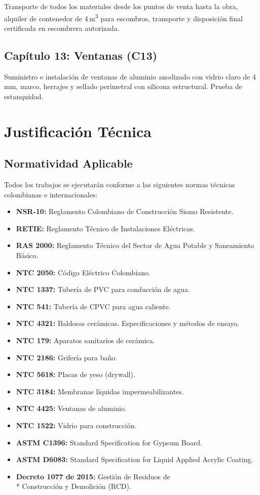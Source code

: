 ﻿\documentclass[12pt]{article}
\begin{document}
Transporte de todos los materiales desde los puntos de venta hasta la obra, alquiler de contenedor de
4\,m\textsuperscript{3} para escombros, transporte y disposición final certificada en escombrera
autorizada.

\subsection{Capítulo 13: Ventanas (C13)}

Suministro e instalación de ventanas de aluminio anodizado con vidrio claro de 4\,mm, marco, herrajes
y sellado perimetral con silicona estructural. Prueba de estanquidad.

\section{Justificación Técnica}

\subsection{Normatividad Aplicable}

Todos los trabajos se ejecutarán conforme a las siguientes normas técnicas colombianas e
internacionales:

\begin{itemize}[noitemsep]
  \item {\bfseries NSR-10:} Reglamento Colombiano de Construcción Sismo Resistente.
  \item {\bfseries RETIE:} Reglamento Técnico de Instalaciones Eléctricas.
  \item {\bfseries RAS 2000:} Reglamento Técnico del Sector de Agua Potable y Saneamiento Básico.
  \item {\bfseries NTC 2050:} Código Eléctrico Colombiano.
  \item {\bfseries NTC 1337:} Tubería de PVC para conducción de agua.
  \item {\bfseries NTC 541:} Tubería de CPVC para agua caliente.
  \item {\bfseries NTC 4321:} Baldosas cerámicas. Especificaciones y métodos de ensayo.
  \item {\bfseries NTC 179:} Aparatos sanitarios de cerámica.
  \item {\bfseries NTC 2186:} Grifería para baño.
  \item {\bfseries NTC 5618:} Placas de yeso (drywall).
  \item {\bfseries NTC 3184:} Membranas líquidas impermeabilizantes.
  \item {\bfseries NTC 4425:} Ventanas de aluminio.
  \item {\bfseries NTC 1522:} Vidrio para construcción.
  \item {\bfseries ASTM C1396:} Standard Specification for Gypsum Board.
  \item {\bfseries ASTM D6083:} Standard Specification for Liquid Applied Acrylic Coating.
  \item {\bfseries Decreto 1077 de 2015:} Gestión de Residuos de\\*
  Construcción y Demolición (RCD).
\end{itemize}
\end{document}
